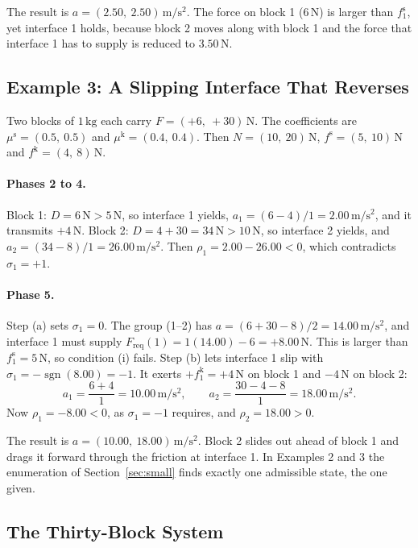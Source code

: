 \documentclass[11pt,a4paper]{article}
\newcommand{\fs}{f^{\mathrm{s}}}
\newcommand{\fkin}{f^{\mathrm{k}}}
\newcommand{\mus}{\mu^{\mathrm{s}}}
\newcommand{\muk}{\mu^{\mathrm{k}}}
\DeclareMathOperator{\sgn}{sgn}
\newcommand{\Freq}{F_{\mathrm{req}}}
\begin{document}
The result is $a=(2.50,\ 2.50)\,\mathrm{m/s^2}$. The force on block 1 ($6\,\mathrm{N}$) is larger than $\fs_1$, yet interface 1 holds, because block 2 moves along with block 1 and the force that interface 1 has to supply is reduced to $3.50\,\mathrm{N}$.

\subsection{Example 3: A Slipping Interface That Reverses}\label{sec:ex3}

Two blocks of $1\,\mathrm{kg}$ each carry $F=(+6,\ +30)\,\mathrm{N}$. The coefficients are $\mus=(0.5,\ 0.5)$ and $\muk=(0.4,\ 0.4)$. Then $N=(10,\ 20)\,\mathrm{N}$, $\fs=(5,\ 10)\,\mathrm{N}$ and $\fkin=(4,\ 8)\,\mathrm{N}$.

\paragraph{Phases 2 to 4.} Block 1: $D=6\,\mathrm{N}>5\,\mathrm{N}$, so interface 1 yields, $a_1=(6-4)/1=2.00\,\mathrm{m/s^2}$, and it transmits $+4\,\mathrm{N}$. Block 2: $D=4+30=34\,\mathrm{N}>10\,\mathrm{N}$, so interface 2 yields, and $a_2=(34-8)/1=26.00\,\mathrm{m/s^2}$. Then $\rho_1=2.00-26.00<0$, which contradicts $\sigma_1=+1$.

\paragraph{Phase 5.} Step (a) sets $\sigma_1=0$. The group (1--2) has $a=(6+30-8)/2=14.00\,\mathrm{m/s^2}$, and interface 1 must supply $\Freq(1)=1(14.00)-6=+8.00\,\mathrm{N}$. This is larger than $\fs_1=5\,\mathrm{N}$, so condition (i) fails. Step (b) lets interface 1 slip with $\sigma_1=-\sgn(8.00)=-1$. It exerts $+\fkin_1=+4\,\mathrm{N}$ on block 1 and $-4\,\mathrm{N}$ on block 2:
\[
a_1=\frac{6+4}{1}=10.00\,\mathrm{m/s^2},\qquad a_2=\frac{30-4-8}{1}=18.00\,\mathrm{m/s^2}.
\]
Now $\rho_1=-8.00<0$, as $\sigma_1=-1$ requires, and $\rho_2=18.00>0$.

The result is $a=(10.00,\ 18.00)\,\mathrm{m/s^2}$. Block 2 slides out ahead of block 1 and drags it forward through the friction at interface 1. In Examples 2 and 3 the enumeration of Section~\ref{sec:small} finds exactly one admissible state, the one given.

\subsection{The Thirty-Block System}\label{sec:thirty}
\end{document}
